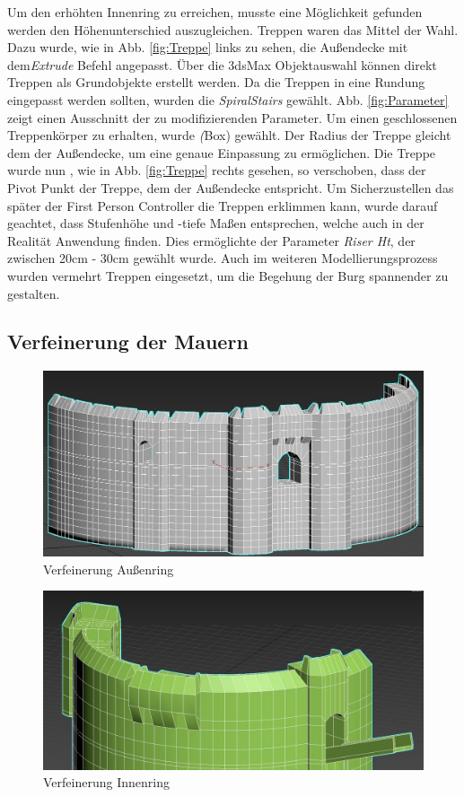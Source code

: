 Um den erhöhten Innenring zu erreichen, musste eine Möglichkeit gefunden werden den Höhenunterschied auszugleichen. Treppen waren das Mittel der Wahl. Dazu wurde, wie in Abb. \ref{fig:Treppe} links zu sehen, die Außendecke mit dem\textit{Extrude} Befehl angepasst. Über die 3dsMax Objektauswahl können direkt Treppen als Grundobjekte erstellt werden. Da die Treppen in eine Rundung eingepasst werden sollten, wurden die \textit{SpiralStairs} gewählt. Abb. \ref{fig:Parameter} zeigt einen Ausschnitt der zu modifizierenden Parameter. Um einen geschlossenen Treppenkörper zu erhalten, wurde \textit(Box) gewählt. Der Radius der Treppe gleicht dem der Außendecke, um eine genaue Einpassung zu ermöglichen. Die Treppe wurde nun , wie in Abb. \ref{fig:Treppe} rechts gesehen, so verschoben, dass der Pivot Punkt der Treppe, dem der Außendecke entspricht. Um Sicherzustellen das später der First Person Controller die Treppen erklimmen kann, wurde darauf geachtet, dass Stufenhöhe und -tiefe Maßen entsprechen, welche auch in der Realität Anwendung finden. Dies ermöglichte der Parameter \textit{Riser Ht}, der zwischen 20cm - 30cm gewählt wurde. Auch im weiteren Modellierungsprozess wurden vermehrt Treppen eingesetzt, um die Begehung der Burg spannender zu gestalten.

\newpage
\subsection{Verfeinerung der Mauern}

\begin{figure}[h]
	\centering
	\includegraphics[width=0.95 \linewidth]{Abbildungen/3dsMax/Aussenring}
	\caption{Verfeinerung Außenring}
	\label{fig:Aussenring}
\end{figure}

\begin{figure}[h]
	\centering
	\includegraphics[width=0.95 \linewidth]{Abbildungen/3dsMax/Innenring}
	\caption{Verfeinerung Innenring}
	\label{fig:Innenring}
\end{figure}

